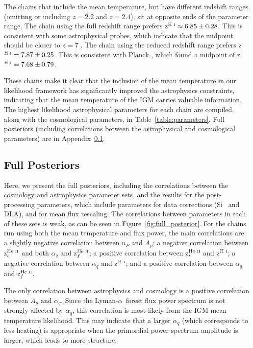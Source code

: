 \documentclass[a4paper,11pt]{article}
\newcommand{\lya}{Lyman-$\alpha$\ }
\begin{document}
The chains that include the mean temperature, but have different redshift ranges (omitting or including $z=2.2$ and $z=2.4$), sit at opposite ends of the parameter range.
The chain using the full redshift range prefers z$^{\text{H~{\sc i}}} \approx 6.85\pm0.28$.
This is consistent with some astrophysical probes, which indicate that the midpoint should be closer to $z=7$ \cite{2021ApJ...919..120M}.
The chain using the reduced redshift range prefers z$^{\text{H~{\sc i}}} = 7.87\pm0.25$.
This is consistent with Planck \cite{2020A&A...641A...6P}, which found a midpoint of z$^{\text{H~{\sc i}}} = 7.68 \pm 0.79$.

These chains make it clear that the inclusion of the mean temperature in our likelihood framework has significantly improved the astrophysics constraints, indicating that the mean temperature of the IGM carries valuable information.
The highest likelihood astrophysical parameters for each chain are compiled, along with the cosmological parameters, in Table~\ref{table:parameters}.
Full posteriors (including correlations between the astrophysical and cosmological parameters) are in Appendix~\ref{sec:posteriors}.

\subsection{Full Posteriors}\label{sec:posteriors}

Here, we present the full posteriors, including the correlations between the cosmology and astrophysics parameter sets, and the results for the post-processing parameters, which include parameters for data corrections (Si~{} and DLA), and for mean flux rescaling.
The correlations between parameters in each of these sets is weak, as can be seen in Figure~\ref{fig:full_posterior}.
For the chains run using both the mean temperature and flux power, the main correlations are: a slightly negative correlation between $n_P$ and $A_p$; a negative correlation between z$^{\text{He~{\sc ii}}}_i$ and both $\alpha_q$ and z$^{\text{He~{\sc ii}}}_f$; a positive correlation between z$^{\text{He~{\sc ii}}}_i$ and z$^{\text{H~{\sc i}}}$; a negative correlation between $\alpha_q$ and z$^{\text{H~{\sc i}}}$; and a positive correlation between $\alpha_q$ and z$^{\text{He~{\sc ii}}}_f$.

The only correlation between astrophysics and cosmology is a positive correlation between $A_p$ and $\alpha_q$.
Since the \lya forest flux power spectrum is not strongly affected by $\alpha_q$, this correlation is most likely from the IGM mean temperature likelihood.
This may indicate that a larger $\alpha_q$ (which corresponds to less heating) is appropriate when the primordial power spectrum amplitude is larger, which leads to more structure.
\end{document}
